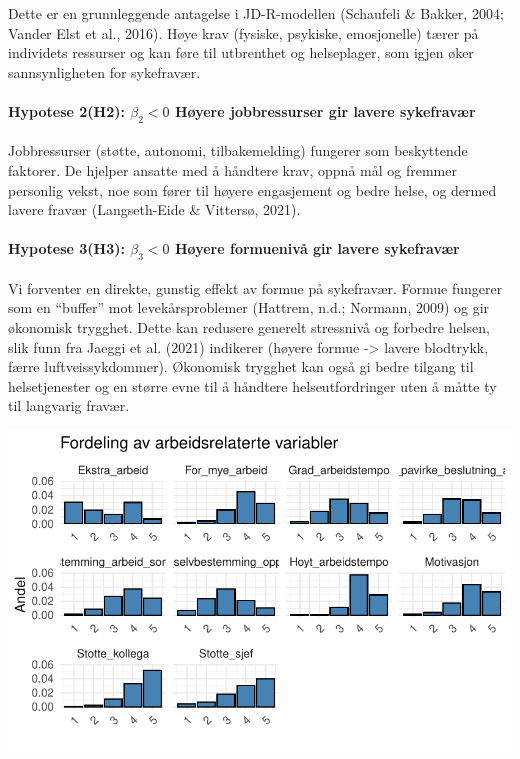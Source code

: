 \documentclass[
  12pt,
  a4paper,
  DIV=11,
  numbers=noendperiod]{scrartcl}
\let\oldparagraph\paragraph
\renewcommand{\paragraph}[1]{\oldparagraph{#1}\mbox{}}
\begin{document}
Dette er en grunnleggende antagelse i JD-R-modellen (Schaufeli \&
Bakker, 2004; Vander Elst et al., 2016). Høye krav (fysiske, psykiske,
emosjonelle) tærer på individets ressurser og kan føre til utbrenthet og
helseplager, som igjen øker sannsynligheten for sykefravær.

\paragraph{\texorpdfstring{Hypotese 2(H2): \(\beta_2 < 0\) Høyere
jobbressurser gir lavere
sykefravær}{Hypotese 2(H2): \textbackslash beta\_2 \textless{} 0 Høyere jobbressurser gir lavere sykefravær}}\label{hypotese-2h2-beta_2-0-huxf8yere-jobbressurser-gir-lavere-sykefravuxe6r}

Jobbressurser (støtte, autonomi, tilbakemelding) fungerer som
beskyttende faktorer. De hjelper ansatte med å håndtere krav, oppnå mål
og fremmer personlig vekst, noe som fører til høyere engasjement og
bedre helse, og dermed lavere fravær (Langseth-Eide \& Vittersø, 2021).

\paragraph{\texorpdfstring{Hypotese 3(H3): \(\beta_3 < 0\) Høyere
formuenivå gir lavere
sykefravær}{Hypotese 3(H3): \textbackslash beta\_3 \textless{} 0 Høyere formuenivå gir lavere sykefravær}}\label{hypotese-3h3-beta_3-0-huxf8yere-formuenivuxe5-gir-lavere-sykefravuxe6r}

Vi forventer en direkte, gunstig effekt av formue på sykefravær. Formue
fungerer som en ``buffer'' mot levekårsproblemer (Hattrem, n.d.;
Normann, 2009) og gir økonomisk trygghet. Dette kan redusere generelt
stressnivå og forbedre helsen, slik funn fra Jaeggi et al. (2021)
indikerer (høyere formue -\textgreater{} lavere blodtrykk, færre
luftveissykdommer). Økonomisk trygghet kan også gi bedre tilgang til
helsetjenester og en større evne til å håndtere helseutfordringer uten å
måtte ty til langvarig fravær.

\includegraphics{kand_SOK2209_Bacheloroppgave_V25_files/figure-pdf/unnamed-chunk-19-1.pdf}
\end{document}
